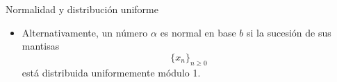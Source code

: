 \documentclass[spanish,xcolor={table}]{beamer}
\begin{document}

\begin{frame}{Normalidad y distribución uniforme}

  \begin{itemize}
    \item Alternativamente, un número $\alpha$ es normal en base $b$ si
    la sucesión de sus mantisas
    \[ \lbrace x_n \rbrace_{n \geq 0} \]
    está distribuida uniformemente módulo 1.
  \end{itemize}

\end{frame}

\end{document}

